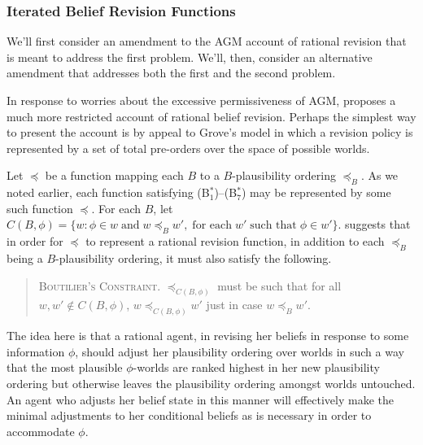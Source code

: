 \subsubsection{Iterated Belief Revision Functions}\label{caie-section2-4-2}

We'll first consider an amendment to the AGM account of rational revision that is meant to address the first problem.
We'll, then, consider an alternative amendment that addresses both the first and the second problem.

In response to worries about the excessive permissiveness of AGM, \citet{Boutilier1} proposes a much more restricted account of rational belief revision.
Perhaps the simplest way to present the account is by appeal to Grove's model in which a revision policy is represented by a set of total pre-orders over the space of possible worlds.

Let $\preceq$ be a function mapping each $B$ to a $B$-plausibility ordering $\preceq_B$.
As we noted earlier, each function satisfying (B$^*_1$)--(B$^*_7$) may be represented by some such function $\preceq$.
For each $B$, let $C(B, \phi) = \{w: \phi \in w \; \text{and} \; w \preceq_B w', \;\text{for each} \; w' \; \text{such that} \; \phi \in w' \}$.
\citet{Boutilier1} suggests that in order for $\preceq$ to represent a rational revision function, in addition to each $\preceq_B$ being a $B$-plausibility ordering, it must also satisfy the following.
\begin{quote}
\textsc{Boutilier's Constraint.}\; $\preceq_{C(B, \phi)}$ must be such that for all $w, w' \not \in C(B, \phi)$, $w \preceq_{C(B, \phi)} w'$ just in case $w \preceq_{B} w'$.
\end{quote}
The idea here is that a rational agent, in revising her beliefs in response to some information $\phi$, should adjust her plausibility ordering over worlds in such a way that the most plausible $\phi$-worlds are ranked highest in her new plausibility ordering but otherwise leaves the plausibility ordering amongst worlds untouched.
An agent who adjusts her belief state in this manner will effectively make the minimal adjustments to her conditional beliefs as is necessary in order to accommodate $\phi$.

